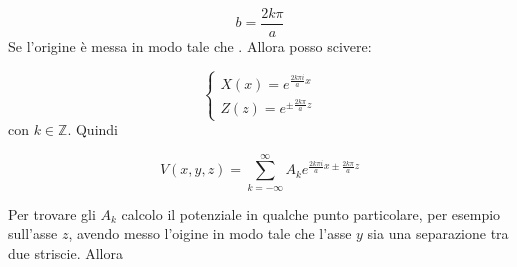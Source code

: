 \documentclass[../main.tex]{subfiles}
\begin{document}
\begin{equation}
  b=\frac{2k \pi}{a}
\end{equation}
Se l'origine \`e messa in modo tale che . Allora posso scivere:

\begin{equation}
  \left\{
    \begin{aligned}
      X(x)=e^{\frac{2 k \pi i}{a}x} \\
      Z(z)=e^{\pm \frac{2 k \pi}{a}z}
    \end{aligned}
  \right.
\end{equation}
con $k\in \mathbb Z$. Quindi

\begin{equation}
  V(x,y,z)=\sum_{k=-\infty}^\infty A_k e^{\frac{2 k \pi i}{a} x \pm \frac{2 k \pi}{a} z }
\end{equation}

Per trovare gli $A_k$ calcolo il potenziale in qualche punto particolare, per esempio sull'asse $z$, avendo messo l'oigine in modo tale che l'asse $y$ sia una separazione tra due striscie. Allora 
\end{document}
